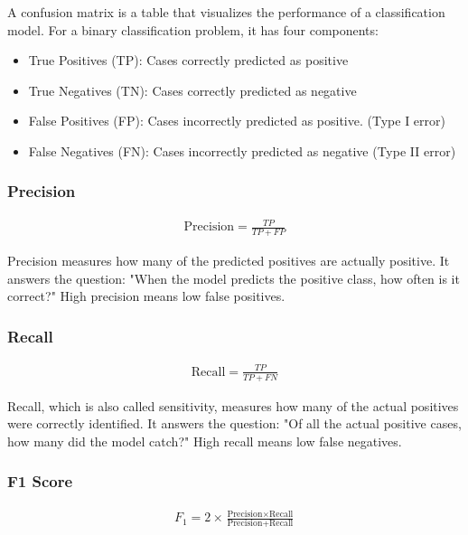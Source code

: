 A confusion matrix is a table that visualizes the performance 
of a classification model. For a binary classification problem, it has four
components: \\

\begin{itemize}
	\item True Positives (TP): Cases correctly predicted as positive
	\item True Negatives (TN): Cases correctly predicted as negative
	\item False Positives (FP): Cases incorrectly predicted as positive. (Type I error)
	\item False Negatives (FN): Cases incorrectly predicted as negative (Type II error)
\end{itemize}


\subsubsection{Precision}
\begin{eqnarray}
	\text{Precision} = \frac{TP}{TP + FP}
	\label{eq:precision}
\end{eqnarray}

Precision measures how many of the predicted positives are actually positive. It answers the question: 
"When the model predicts the positive class, how often is it correct?" High precision means low false positives.

\subsubsection{Recall}
\begin{eqnarray}
	\text{Recall} = \frac{TP}{TP + FN}
	\label{eq:recall}
\end{eqnarray}

Recall, which is also called sensitivity, measures how many of the actual positives were correctly identified. 
It answers the question: 
"Of all the actual positive cases, how many did the model catch?" High recall means low false negatives.

\subsubsection{F1 Score}
\begin{eqnarray}
	F_1 = 2\times \frac{\text{Precision} \times \text{Recall}}{\text{Precision} + \text{Recall}}
	\label{eq:f1_score}
\end{eqnarray}

